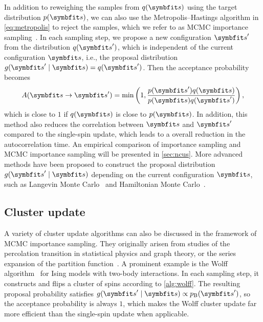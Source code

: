 In addition to reweighing the samples from $q(\vs)$ using the target distribution $p(\vs)$, we can also use the Metropolis--Hastings algorithm in \cref{eq:metropolis} to reject the samples, which we refer to as MCMC importance sampling~\cite{liesenfeld2008improving, schuster2020markov}. In each sampling step, we propose a new configuration $\vs'$ from the distribution $q(\vs')$, which is independent of the current configuration $\vs$, i.e., the proposal distribution $g(\vs' \mid \vs) = q(\vs')$. Then the acceptance probability becomes
\begin{equation}
A(\vs \to \vs') = \min\left( 1, \frac{p(\vs') q(\vs)}{p(\vs) q(\vs')} \right),
\label{eq:mcmc-importance}
\end{equation}
which is close to $1$ if $q(\vs)$ is close to $p(\vs)$. In addition, this method also reduces the correlation between $\vs$ and $\vs'$ compared to the single-spin update, which leads to a overall reduction in the autocorrelation time. An empirical comparison of importance sampling and MCMC importance sampling will be presented in \cref{sec:ncus}. More advanced methods have been proposed to construct the proposal distribution $g(\vs' \mid \vs)$ depending on the current configuration $\vs$, such as Langevin Monte Carlo~\cite{rossky1978brownian} and Hamiltonian Monte Carlo~\cite{duane1987hybrid}.

\subsection{Cluster update}
\label{sec:cluster-update}

A variety of cluster update algorithms can also be discussed in the framework of MCMC importance sampling. They originally arisen from studies of the percolation transition in statistical physics and graph theory, or the series expansion of the partition function~\cite{fortuin1972random, leung1991percolation, evertz1993cluster}. A prominent example is the Wolff algorithm~\cite{wolff1989collective} for Ising models with two-body interactions. In each sampling step, it constructs and flips a cluster of spins according to \cref{alg:wolff}. The resulting proposal probability satisfies $g(\vs' \mid \vs) \propto p_\text{B}(\vs')$, so the acceptance probability is always $1$, which makes the Wolff cluster update far more efficient than the single-spin update when applicable.

